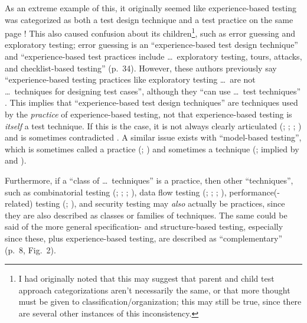 As an extreme example of this, it originally
seemed like experience-based testing was categorized as both a test design
technique and a test practice on the same page \citep[p.~22]{IEEE2022}! This
also caused confusion about its children\footnote{I had originally noted that
      this may suggest that parent and child test approach categorizations
      aren't necessarily the same, or that more thought must be given to
      classification/organization; this may still be true, since there are
      several other instances of this inconsistency.}, such as error guessing
and exploratory testing; error guessing is an ``experience-based test design
technique'' and ``experience-based test practices include \dots\ exploratory
testing, tours, attacks, and checklist-based testing'' (p.~34).
However, these authors previously say
``experience-based testing practices like exploratory testing \dots\ are not
\dots\ techniques for designing test cases'', although they ``can use \dots\
test techniques'' \citeyearpar[p.~viii]{IEEE2021}. This implies that
``experience-based test design techniques'' are techniques used by the
\emph{practice} of experience-based testing, not that experience-based testing
is \emph{itself} a test technique. If this is the case, it is not always clearly
articulated (\citealp[pp.~4,~22]{IEEE2022}; \citeyear[p.~4]{IEEE2021};
\citealp[p.~5-13]{SWEBOK2024}; \citealpISTQB{}) and is sometimes contradicted
\citep[p.~46]{Firesmith2015}. A similar issue exists with ``model-based
testing'', which is sometimes called a practice (\citealp[p.~22]{IEEE2022};
\citeyear[p.~viii]{IEEE2021}) and sometimes a technique (\citealp[p.~4]{Kam2008};
implied by \citealp[p.~7]{IEEE2021} and \citeyear[p.~469]{IEEE2017}).

Furthermore, if a ``class of \dots\ techniques''
is a practice, then other ``techniques'', such as combinatorial testing
(\citealp[pp.~3,~22]{IEEE2022}; \citeyear[p.~2]{IEEE2021};
\citealp[p.~5-11]{SWEBOK2024}; \citealpISTQB{}), data flow testing
(\citealp[p.~22]{IEEE2022}; \citeyear[p.~3]{IEEE2021};
\citealp[p.~5-13]{SWEBOK2024}; \citealp[p.~43]{Kam2008}), performance(-related)
testing (\citealp[p.~38]{IEEE2021}; \citealp[p.~1187]{Moghadam2019}), and
security testing \citep[p.~40]{IEEE2021} may \emph{also}
actually be practices, since they are also described as classes or families of
techniques. The same could be said of the more
general specification- and structure-based testing, especially since these,
plus experience-based testing, are described as ``complementary'' (p.~8, Fig.~2).

